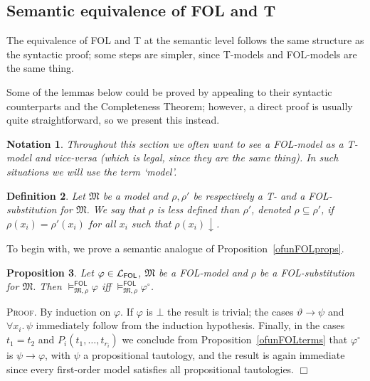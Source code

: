 \documentclass{article}
\newtheorem{definition}{Definition}[section]
\newtheorem{proposition}[definition]{Proposition}
\newtheorem{notation}[definition]{Notation}
\newenvironment{proof}{\smallskip\textsc{Proof.}}{\hspace*{\fill}$\Box$}
\newcommand{\T}{\textsf T}
\newcommand{\FOL}{\textsf{FOL}}
\newcommand{\ofun}[1]{\ensuremath{{#1}^\circ}}
\newcommand{\defined}{\ensuremath{\!\downarrow}}
\newcommand{\lang}[1]{\ensuremath{{\cal L}_{\mathsf{#1}}}}
\newcommand{\mymodelss}[3]{\ensuremath{\models_{\mathfrak{#2},{#3}}^{\mathsf{#1}}}}
\def\sep{.\,}
\begin{document}
\subsection{Semantic equivalence of {\FOL} and {\T}}

The equivalence of {\FOL} and {\T} at the semantic level follows the
same structure as the syntactic proof; some steps are simpler, since
{\T}-models and {\FOL}-models are the same thing.

Some of the lemmas below could be proved by appealing to their syntactic
counterparts and the Completeness Theorem; however, a direct proof is
usually quite straightforward, so we present this instead.

\begin{notation}
Throughout this section we often want to see a {\FOL}-model as a {\T}-model
and vice-versa (which is legal, since they are the same thing).  In such
situations we will use the term `model'.
\end{notation}

\begin{definition}\label{defn:lessdefined} Let $\mathfrak M$ be a model
and $\rho,\rho'$ be respectively a {\T}- and a {\FOL}-substitution
for $\mathfrak M$.  We say that $\rho$ is \emph{less defined} than
$\rho'$, denoted $\rho\subseteq\rho'$, if $\rho(x_i)=\rho'(x_i)$
for all $x_i$ such that $\rho(x_i)\defined$.
\end{definition}

To begin with, we prove a semantic analogue of
Proposition~\ref{ofunFOLprops}.
\begin{proposition}\label{ofunFOLequiv} Let $\varphi\in\lang{FOL}$,
$\mathfrak M$ be a {\FOL}-model and $\rho$ be a {\FOL}-substitution
for $\mathfrak M$.  Then $\mymodelss{FOL}M\rho\varphi$ iff
$\mymodelss{FOL}M\rho\ofun\varphi$.
\end{proposition}
\begin{proof}
By induction on $\varphi$.  If $\varphi$ is $\bot$ the result is
trivial; the cases $\vartheta\to\psi$ and $\forall x_i\sep\psi$
immediately follow from the induction hypothesis.  Finally, in the
cases $t_1=t_2$ and $P_i(t_1,\ldots,t_{r_i})$ we conclude from
Proposition~\ref{ofunFOLterms} that $\ofun\varphi$ is
$\psi\to\varphi$, with $\psi$ a propositional tautology, and the
result is again immediate since every first-order model satisfies all
propositional tautologies.
\end{proof}
\end{document}
